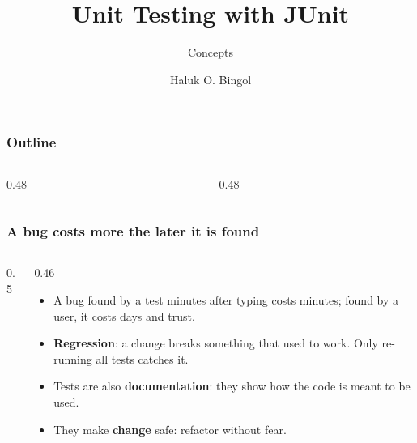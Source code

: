 \documentclass[aspectratio=169,10pt,compress]{beamer}
\title{Unit Testing with JUnit}
\subtitle{Concepts}
\author[Bingol]{Haluk O. Bingol}
\institute[FCIS]{
    Faculty of Computer and Information Sciences\\
    Yeditepe University
}
\date{
	{\tiny \hbTimeStamp}
}
\begin{document}
\begin{frame}[t,fragile]
  \titlepage
\end{frame}




\begin{frame}[t,fragile] \frametitle{Outline}
  \begin{columns}[T]
    \begin{column}{0.48\textwidth}
      \tableofcontents[sections={1-4}, hideallsubsections]
    \end{column}
    \begin{column}{0.48\textwidth}
      \tableofcontents[sections={5-8}, hideallsubsections]
    \end{column}
  \end{columns}
\end{frame}





\begin{frame}[t,fragile] \frametitle{A bug costs more the later it is found}
  \begin{columns}[T]
    \begin{column}{0.5\textwidth}
      \begin{center}
      \end{center}
    \end{column}
    \begin{column}{0.46\textwidth}
      \begin{itemize}\small
        \item A bug found by a test minutes after typing costs minutes; found by a user, it costs days and trust.
        \item \textbf{Regression}: a change breaks something that used to work. Only re-running all tests catches it.
        \item Tests are also \textbf{documentation}: they show how the code is meant to be used.
        \item They make \textbf{change} safe: refactor without fear.
      \end{itemize}
    \end{column}
  \end{columns}
\end{frame}
\end{document}
